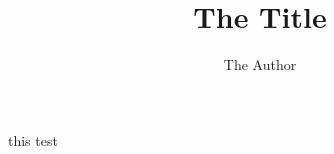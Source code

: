 \documentclass{beamer}
\title{The Title}
\author{The Author}
\institute{The Institute}
\begin{document}
 \begin{frame}
  \maketitle
 \end{frame}


\begin{frame}{this}
 test
\end{frame}
\end{document}
